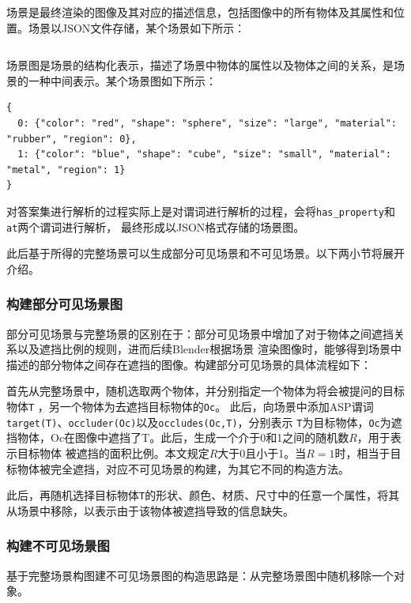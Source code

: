 场景是最终渲染的图像及其对应的描述信息，包括图像中的所有物体及其属性和位置。场景以JSON文件存储，某个场景如下所示：
\begin{lstlisting}

\end{lstlisting}

场景图是场景的结构化表示，描述了场景中物体的属性以及物体之间的关系，是场景的一种中间表示。某个场景图如下所示：
\begin{lstlisting}
{
  0: {"color": "red", "shape": "sphere", "size": "large", "material": "rubber", "region": 0},
  1: {"color": "blue", "shape": "cube", "size": "small", "material": "metal", "region": 1}
}
\end{lstlisting}

对答案集进行解析的过程实际上是对谓词进行解析的过程，会将\texttt{has\_property}和\texttt{at}两个谓词进行解析，
最终形成以JSON格式存储的场景图。

此后基于所得的完整场景可以生成部分可见场景和不可见场景。以下两小节将展开介绍。
\subsubsection{构建部分可见场景图}
部分可见场景与完整场景的区别在于：部分可见场景中增加了对于物体之间遮挡关系以及遮挡比例的规则，进而后续Blender根据场景
渲染图像时，能够得到场景中描述的部分物体之间存在遮挡的图像。构建部分可见场景的具体流程如下：

首先从完整场景中，随机选取两个物体，并分别指定一个物体为将会被提问的目标物体\texttt{T}
，另一个物体为去遮挡目标物体的\texttt{Oc}。
此后，向场景中添加ASP谓词\texttt{target(T)}、\texttt{occluder(Oc)}以及\texttt{occludes(Oc,T)}，分别表示
\texttt{T}为目标物体，\texttt{Oc}为遮挡物体，Oc在图像中遮挡了T。此后，生成一个介于0和1之间的随机数$R$，用于表示目标物体
被遮挡的面积比例。本文规定$R$大于0且小于1。当$R=1$时，相当于目标物体被完全遮挡，对应不可见场景的构建，为其它不同的构造方法。

此后，再随机选择目标物体\texttt{T}的形状、颜色、材质、尺寸中的任意一个属性，将其从场景中移除，以表示由于该物体被遮挡导致的信息缺失。
\subsubsection{构建不可见场景图}
基于完整场景构图建不可见场景图的构造思路是：从完整场景图中随机移除一个对象。

